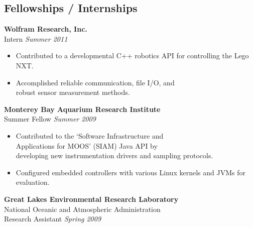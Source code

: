 \documentclass{article}
\begin{document}
{\begin{multicols}{2}
            \section*{Fellowships / Internships}
            \noindent
                \textbf{Wolfram Research, Inc. }\\
                 Intern \hfill \textsl{Summer 2011} \\
                \vspace{ -10px}
                \begin{itemize}[noitemsep,nolistsep]
                	\item Contributed to a developmental C++ robotics API for controlling the Lego NXT. 
                	\item Accomplished reliable communication, file I/O, and \\robust sensor measurement methods. 
                \end{itemize}
                \vspace{5px}
                \textbf{Monterey Bay Aquarium Research Institute}\\
                 Summer Fellow \hfill \textsl{Summer 2009}  \\
                \vspace{ -10px}	
                \begin{itemize}[noitemsep,nolistsep]
                	\item Contributed to the `Software Infrastructure and \\Applications for MOOS' (SIAM) Java API by \\developing new instrumentation drivers and sampling protocols.
                	\item Configured embedded controllers with various Linux kernels and JVMs for evaluation.
                \end{itemize}
                \vspace{5px}
                \textbf{Great Lakes Environmental Research Laboratory}\\
                National Oceanic and Atmospheric Administration\\
                Research Assistant \hfill \textsl{Spring 2009} \\
                \vspace{ -10px}

\end{multicols}}
\end{document}
